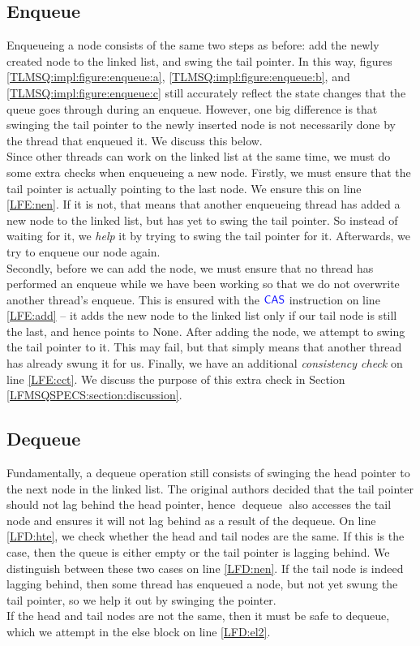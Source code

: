 \documentclass[a4paper, 10pt]{report}
\theoremstyle{definition}
\newcommand{\dequeue}{\operatorname{dequeue}}
\begin{document}
\subsection{Enqueue}
Enqueueing a node consists of the same two steps as before: add the newly created node to the linked list, and swing the tail pointer. In this way, figures \ref{TLMSQ:impl:figure:enqueue:a}, \ref{TLMSQ:impl:figure:enqueue:b}, and \ref{TLMSQ:impl:figure:enqueue:c} still accurately reflect the state changes that the queue goes through during an enqueue. However, one big difference is that swinging the tail pointer to the newly inserted node is not necessarily done by the thread that enqueued it. We discuss this below.\\
Since other threads can work on the linked list at the same time, we must do some extra checks when enqueueing a new node. Firstly, we must ensure that the tail pointer is actually pointing to the last node. We ensure this on line \ref{LFE:nen}. If it is not, that means that another enqueueing thread has added a new node to the linked list, but has yet to swing the tail pointer. So instead of waiting for it, we \textit{help} it by trying to swing the tail pointer for it. Afterwards, we try to enqueue our node again.\\
Secondly, before we can add the node, we must ensure that no thread has performed an enqueue while we have been working so that we do not overwrite another thread's enqueue. This is ensured with the $\textsf{\color{blue} CAS}$ instruction on line \ref{LFE:add} -- it adds the new node to the linked list only if our tail node is still the last, and hence points to $\operatorname{None}$. After adding the node, we attempt to swing the tail pointer to it. This may fail, but that simply means that another thread has already swung it for us.
Finally, we have an additional \textit{consistency check} on line \ref{LFE:cct}. We discuss the purpose of this extra check in Section \ref{LFMSQSPECS:section:discussion}.

\subsection{Dequeue}
Fundamentally, a dequeue operation still consists of swinging the head pointer to the next node in the linked list. The original authors decided that the tail pointer should not lag behind the head pointer, hence $\dequeue$ also accesses the tail node and ensures it will not lag behind as a result of the dequeue. On line \ref{LFD:hte}, we check whether the head and tail nodes are the same. If this is the case, then the queue is either empty or the tail pointer is lagging behind. We distinguish between these two cases on line \ref{LFD:nen}. If the tail node is indeed lagging behind, then some thread has enqueued a node, but not yet swung the tail pointer, so we help it out by swinging the pointer.\\
If the head and tail nodes are not the same, then it must be safe to dequeue, which we attempt in the else block on line \ref{LFD:el2}.
\end{document}
